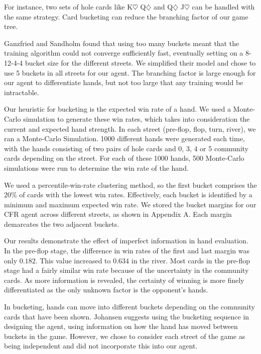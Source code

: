 \documentclass{article}
\begin{document}
For instance, two sets of hole cards like K$\heartsuit$ Q$\diamondsuit$ and Q$\diamondsuit$ J$\heartsuit$ can be handled with the same strategy. Card bucketing can reduce the branching factor of our game tree.

Ganzfried and Sandholm found that using too many buckets meant that the training algorithm could not converge sufficiently fast, eventually setting on a 8-12-4-4 bucket size for the different streets. We simplified their model and chose to use 5 buckets in all streets for our agent. The branching factor is large enough for our agent to differentiate hands, but not too large that any training would be intractable.

Our heuristic for bucketing is the expected win rate of a hand. We used a Monte-Carlo simulation to generate these win rates, which takes into consideration the current and expected hand strength. In each street (pre-flop, flop, turn, river), we ran a Monte-Carlo Simulation. 1000 different hands were generated each time, with the hands consisting of two pairs of hole cards and 0, 3, 4 or 5 community cards depending on the street. For each of these 1000 hands, 500 Monte-Carlo simulations were run to determine the win rate of the hand.

We used a percentile-win-rate clustering method, so the first bucket comprises the 20\% of cards with the lowest win rates. Effectively, each bucket is identified by a minimum and maximum expected win rate. We stored the bucket margins for our CFR agent across different streets, as shown in Appendix A. Each margin demarcates the two adjacent buckets.

Our results demonstrate the effect of imperfect information in hand evaluation. In the pre-flop stage, the difference in win rates of the first and last margin was only $0.182$. This value increased to $0.634$ in the river. Most cards in the pre-flop stage had a fairly similar win rate because of the uncertainty in the community cards. As more information is revealed, the certainty of winning is more finely differentiated as the only unknown factor is the opponent's hands.

In bucketing, hands can move into different buckets depending on the community cards that have been shown. Johansen suggests using the bucketing sequence in designing the agent, using information on how the hand has moved between buckets in the game. However, we chose to consider each street of the game as being independent and did not incorporate this into our agent.
\end{document}
